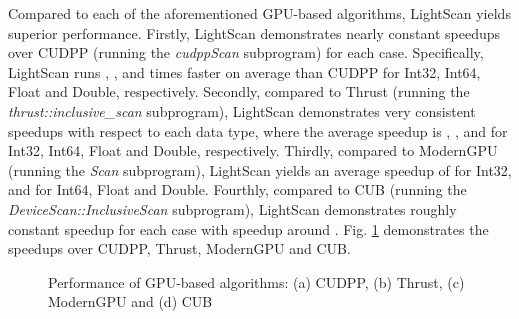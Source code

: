 \documentclass[article]{elsarticle}
\begin{document}
{Compared to each of the aforementioned GPU-based algorithms, LightScan yields superior performance. Firstly, LightScan demonstrates nearly constant speedups over CUDPP (running the \textit{cudppScan} subprogram) for each case. Specifically, LightScan runs , ,  and  times faster on average than CUDPP for Int32, Int64, Float and Double, respectively. Secondly, compared to Thrust (running the \textit{thrust::inclusive\_scan} subprogram), LightScan demonstrates very consistent speedups with respect to each data type, where the average speedup is , ,  and  for Int32, Int64, Float and Double, respectively. Thirdly, compared to ModernGPU (running the \textit{Scan} subprogram), LightScan yields an average speedup of  for Int32, and  for Int64, Float and Double. Fourthly, compared to CUB (running the \textit{DeviceScan::InclusiveScan} subprogram), LightScan  demonstrates roughly constant speedup for each case with speedup around . Fig. \ref{fig:gpu_others} demonstrates the speedups over CUDPP, Thrust, ModernGPU and CUB.
\begin{figure}[!h]
\centering

\begin{minipage}[b]{0.49\linewidth}
\end{minipage}
\begin{minipage}[b]{0.49\linewidth}
\end{minipage}

\begin{minipage}[b]{0.49\linewidth}
\end{minipage}
\begin{minipage}[b]{0.49\linewidth}
\end{minipage}

\caption{Performance of GPU-based algorithms: (a) CUDPP, (b) Thrust, (c) ModernGPU and (d) CUB}
\label{fig:gpu_others}
\end{figure}
}
\end{document}
